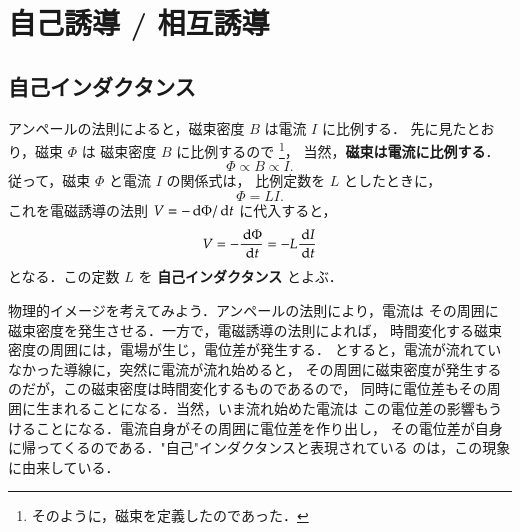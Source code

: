     \section{自己誘導 / 相互誘導}
    \subsection{自己インダクタンス}
        アンペールの法則によると，磁束密度 $B$ は電流 $I$ に比例する．
        先に見たとおり，磁束 $\Phi$ は 磁束密度 $B$ に比例するので
            \footnote{
                そのように，磁束を定義したのであった．
            }，
        当然，\textbf{磁束は電流に比例する}．
            \begin{equation*}
               \Phi \propto B \propto I.
            \end{equation*}
        従って，磁束 $\Phi$ と電流 $I$ の関係式は，
        比例定数を $L$ としたときに，
            \begin{equation*}
                \Phi = LI.
            \end{equation*}
        これを電磁誘導の法則 $V=-\,\mathrm{d} \Phi/\,\mathrm{d} t$ に代入すると，
            \begin{align}
                V=-\frac{\,\mathrm{d} \Phi}{\,\mathrm{d} t}
                 =-L\frac{\,\mathrm{d} I}{\,\mathrm{d} t}
            \end{align}
        となる．この定数 $L$ を \textbf{自己インダクタンス} とよぶ．

        物理的イメージを考えてみよう．アンペールの法則により，電流は
        その周囲に磁束密度を発生させる．一方で，電磁誘導の法則によれば，
        時間変化する磁束密度の周囲には，電場が生じ，電位差が発生する．
        とすると，電流が流れていなかった導線に，突然に電流が流れ始めると，
        その周囲に磁束密度が発生するのだが，この磁束密度は時間変化するものであるので，
        同時に電位差もその周囲に生まれることになる．当然，いま流れ始めた電流は
        この電位差の影響もうけることになる．電流自身がその周囲に電位差を作り出し，
        その電位差が自身に帰ってくるのである．"自己"インダクタンスと表現されている
        のは，この現象に由来している．

